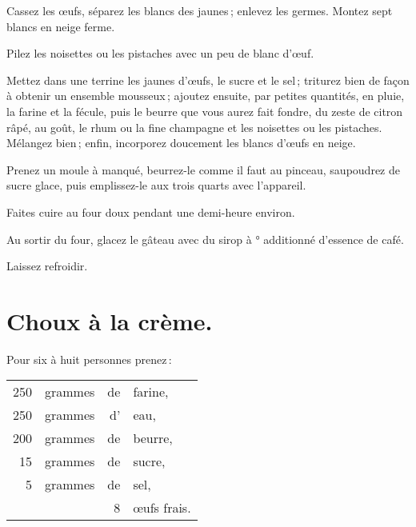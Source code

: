 Cassez les œufs, séparez les blancs des jaunes ; enlevez les germes. Montez
sept blancs en neige ferme.

Pilez les noisettes ou les pistaches avec un peu de blanc d'œuf.

Mettez dans une terrine les jaunes d'œufs, le sucre et le sel ; triturez bien de
façon à obtenir un ensemble mousseux ; ajoutez ensuite, par petites quantités, en
pluie, la farine et la fécule, puis le beurre que vous aurez fait fondre, du zeste de
citron râpé, au goût, le rhum ou la fine champagne et les noisettes ou les pistaches.
Mélangez bien ; enfin, incorporez doucement les blancs d'œufs en neige.

Prenez un moule à manqué, beurrez-le comme il faut au pinceau, saupoudrez
de sucre glace, puis emplissez-le aux trois quarts avec l'appareil.

Faites cuire au four doux pendant une demi-heure environ.

Au sortir du four, glacez le gâteau avec du sirop à {\mmm}° additionné
d'essence de café.

Laissez refroidir.

\label{pg0915} \hypertarget{p0915}{}
\section*{\centering Choux à la crème.}
{}

Pour six à huit personnes prenez :

\footnotesize
\begin{longtable}{rrrp{16em}}
    250 & grammes & de & farine,                                                                          \\
    250 & grammes & d’ & eau,                                                                             \\
    200 & grammes & de & beurre,                                                                          \\
     15 & grammes & de & sucre,                                                                           \\
      5 & grammes & de & sel,                                                                             \\
        &         &  8 & œufs frais.                                                                      \\
\end{longtable}
\normalsize

